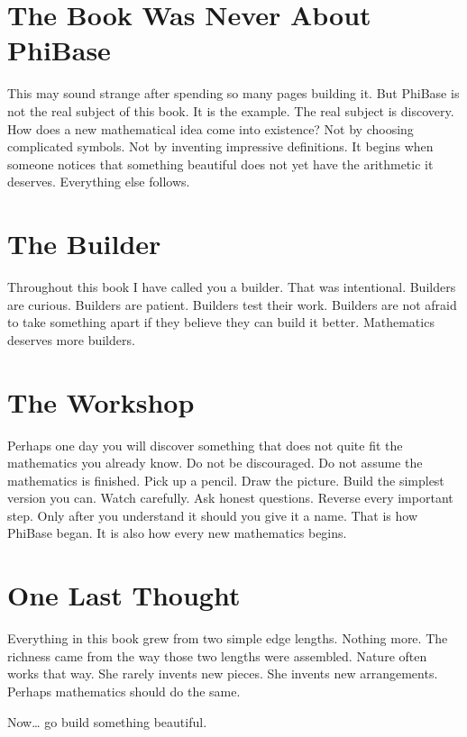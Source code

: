 \section*{The Book Was Never About PhiBase}

This may sound strange after spending so many pages building it. But PhiBase is not the real subject of this book. It is the example. The real subject is discovery. How does a new mathematical idea come into existence? Not by choosing complicated symbols. Not by inventing impressive definitions. It begins when someone notices that something beautiful does not yet have the arithmetic it deserves. Everything else follows.

\section*{The Builder}

Throughout this book I have called you a builder. That was intentional. Builders are curious. Builders are patient. Builders test their work. Builders are not afraid to take something apart if they believe they can build it better. Mathematics deserves more builders.

\section*{The Workshop}

Perhaps one day you will discover something that does not quite fit the mathematics you already know. Do not be discouraged. Do not assume the mathematics is finished. Pick up a pencil. Draw the picture. Build the simplest version you can. Watch carefully. Ask honest questions. Reverse every important step. Only after you understand it should you give it a name. That is how PhiBase began. It is also how every new mathematics begins.

\section*{One Last Thought}

Everything in this book grew from two simple edge lengths. Nothing more. The richness came from the way those two lengths were assembled. Nature often works that way. She rarely invents new pieces. She invents new arrangements. Perhaps mathematics should do the same.

Now\ldots{} go build something beautiful.
